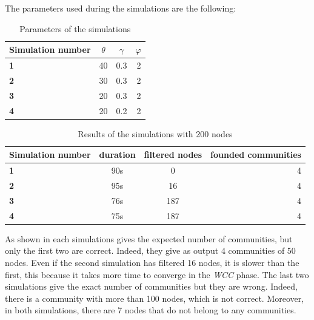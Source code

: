 \documentclass[12pt]{article}
\begin{document}
The parameters used during the simulations are the following:
\begin{table}[tbhp]
    \centering
    \begin{tabu}{|l|c|c|r|}
        \hline
        Simulation number & $\theta$ & $\gamma$  & $\varphi$  \\ \hline
        \textbf{1}    & 40  & 0.3  & 2   \\ \hline
        \textbf{2}    & 30  & 0.3  & 2   \\ \hline
        \textbf{3}    & 20  & 0.3  & 2   \\ \hline
        \textbf{4}    & 20  & 0.2  & 2   \\ \hline

  \end{tabu}                                                                                        \label{tab:parameters3}
    \caption[A Table]{Parameters of the simulations}
\end{table}
\newpage
\begin{table}[H]
    \centering
    \begin{tabu}{|l|c|c|r|}
        \hline
        Simulation number & duration & filtered nodes  & founded communities  \\ \hline
        \textbf{1}    & 90s  & 0  & 4   \\ \hline
        \textbf{2}    & 95s  & 16  & 4   \\ \hline
        \textbf{3}    & 76s  & 187  & 4    \\ \hline
        \textbf{4}    & 75s  & 187  & 4  \\  \hline
    \end{tabu}

    \caption{Results of the simulations with 200 nodes}
    \label{tab:result3}
\end{table}

As shown in  each simulations gives the expected number of communities, but only the first two are correct. Indeed, they give as output 4 communities of 50 nodes. Even if the second simulation has filtered 16 nodes, it is slower than the first, this because it takes more time to converge in the \emph{WCC} phase. The last two simulations give the exact number of communities but they are wrong. Indeed, there is a community with more than 100 nodes, which is not correct. Moreover, in both simulations, there are 7 nodes that do not belong to any communities.




\end{document}
